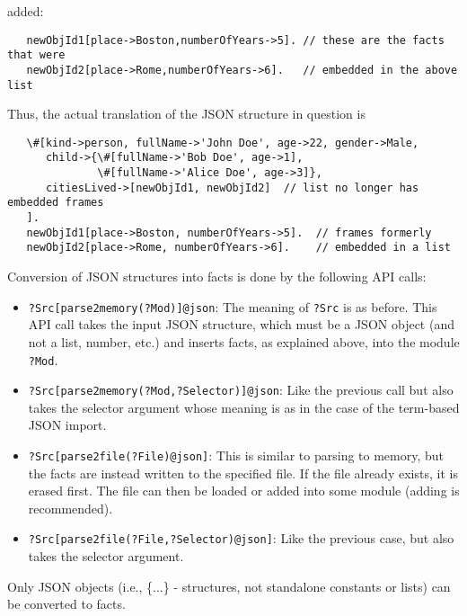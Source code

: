added:
\begin{verbatim}
   newObjId1[place->Boston,numberOfYears->5]. // these are the facts that were
   newObjId2[place->Rome,numberOfYears->6].   // embedded in the above list
\end{verbatim}
Thus, the actual translation of the JSON structure in question is
\begin{verbatim}
   \#[kind->person, fullName->'John Doe', age->22, gender->Male,
      child->{\#[fullName->'Bob Doe', age->1],
              \#[fullName->'Alice Doe', age->3]},
      citiesLived->[newObjId1, newObjId2]  // list no longer has embedded frames
   ].
   newObjId1[place->Boston, numberOfYears->5].  // frames formerly
   newObjId2[place->Rome, numberOfYears->6].    // embedded in a list
\end{verbatim}

Conversion of JSON structures into facts is done by the following API calls:
\begin{itemize}
\item  \texttt{?Src[parse2memory(?Mod)]@\bs{}json}:
  The meaning of \texttt{?Src} is as before. This API call takes the input
  JSON structure, which must be a JSON object (and not a list, number,
  etc.) and inserts facts, as explained above, into the \ERGO module
  \texttt{?Mod}.
\item \texttt{?Src[parse2memory(?Mod,?Selector)]@\bs{}json}:
  Like the previous call but also takes the selector argument whose meaning
  is as in the case of the term-based JSON import.
\item \texttt{?Src[parse2file(?File)@\bs{}json]}:
  This is similar to parsing to memory, but the facts are instead written
  to the specified file. If the file already exists, it is erased first.
  The file can then be loaded or added into some \ERGO module (adding is
  recommended).
\item \texttt{?Src[parse2file(?File,?Selector)@\bs{}json]}:
  Like the previous case, but also takes the selector argument.
\end{itemize}
Only JSON objects (i.e., \{...\} - structures, not standalone constants or
lists) can be converted to facts.

